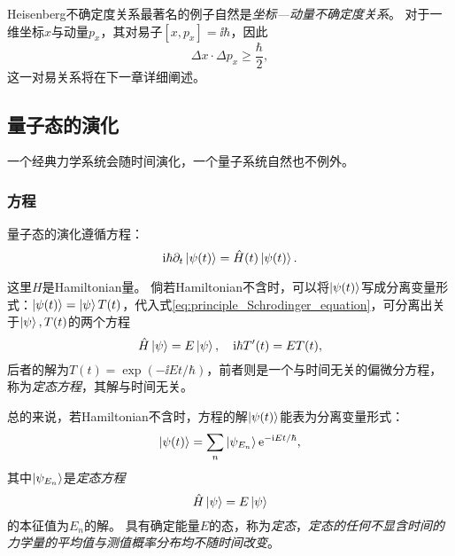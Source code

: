 Heisenberg不确定度关系最著名的例子自然是\emph{坐标—动量不确定度关系}。
对于一维坐标$x$与动量$p_x$，其对易子$[x,p_x]=\ii\hbar$，因此
\begin{equation}
    \label{eq:principle_uncertainty_relation_x_px}
    \Delta x \cdot \Delta p_x \geq \frac{\hbar}{2},
\end{equation}
这一对易关系将在下一章详细阐述。


\subsection{量子态的演化}
\label{subsec:principles_time_evolution}

一个经典力学系统会随时间演化，一个量子系统自然也不例外。

\subsubsection{\schrodinger 方程}

\begin{tcolorbox}
量子态的演化遵循\schrodinger 方程：
\begin{equation}
    \label{eq:principle_Schrodinger_equation}
    \mathrm{i} \hbar \partial_t \ket{\psi(t)} = \hat{H}(t) \ket{\psi(t)}.
\end{equation}
\end{tcolorbox}
这里$H$是Hamiltonian量。
倘若Hamiltonian不含时，可以将$\ket{\psi(t)}$写成分离变量形式：$\ket{\psi(t)}=\ket{\psi}T(t)$，代入式\eqref{eq:principle_Schrodinger_equation}，可分离出关于$\ket{\psi}, T(t)$的两个方程
\begin{equation}
    \hat{H} \ket{\psi} = E \ket{\psi},\quad \mathrm{i}\hbar T'(t) = E T(t),
\end{equation}
后者的解为$T(t) = \exp (-\ii E t/\hbar)$，前者则是一个与时间无关的偏微分方程，称为\emph{定态\schrodinger 方程}，其解与时间无关。
\begin{tcolorbox}
总的来说，若Hamiltonian不含时，\schrodinger 方程的解$\ket{\psi(t)}$能表为分离变量形式：
\begin{equation}
    \ket{\psi(t)} = \sum_n \ket{\psi_{E_n}} \mathrm{e}^{-\mathrm{i} E t/\hbar},
\end{equation}
其中$\ket{\psi_{E_n}}$是\emph{定态\schrodinger 方程}
\begin{equation}
    \hat{H} \ket{\psi} = E \ket{\psi}
\end{equation}
的本征值为$E_n$的解。
具有确定能量$E$的态，称为\emph{定态}，\emph{定态的任何不显含时间的力学量的平均值与测值概率分布均不随时间改变}。
\end{tcolorbox}


